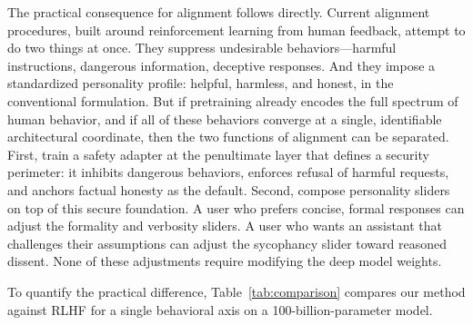 \documentclass[11pt,a4paper]{article}
\begin{document}
The practical consequence for alignment follows directly. Current alignment procedures, built around reinforcement learning from human feedback, attempt to do two things at once. They suppress undesirable behaviors---harmful instructions, dangerous information, deceptive responses. And they impose a standardized personality profile: helpful, harmless, and honest, in the conventional formulation. But if pretraining already encodes the full spectrum of human behavior, and if all of these behaviors converge at a single, identifiable architectural coordinate, then the two functions of alignment can be separated. First, train a safety adapter at the penultimate layer that defines a security perimeter: it inhibits dangerous behaviors, enforces refusal of harmful requests, and anchors factual honesty as the default. Second, compose personality sliders on top of this secure foundation. A user who prefers concise, formal responses can adjust the formality and verbosity sliders. A user who wants an assistant that challenges their assumptions can adjust the sycophancy slider toward reasoned dissent. None of these adjustments require modifying the deep model weights.

To quantify the practical difference, Table~\ref{tab:comparison} compares our method against RLHF for a single behavioral axis on a 100-billion-parameter model.
\end{document}
